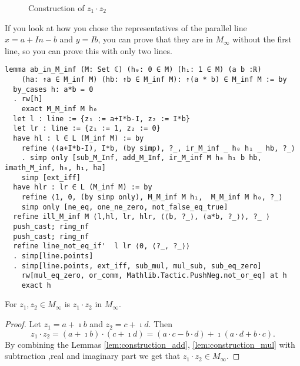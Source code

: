 \begin{figure}[h!]
    \centering
    \caption{Construction of $z_1 \cdot z_2$}
    \label{Fig.5}
\end{figure}

\begin{remark}
    If you look at how you chose the representatives of the parallel line $x = a+In-b$ and $y=Ib$, you can prove that they are in $M_{\infty}$ without the first line, so you can prove this with only two lines.
\end{remark}

\begin{lstlisting}
lemma ab_in_M_inf (M: Set ℂ) (h₀: 0 ∈ M) (h₁: 1 ∈ M) (a b :ℝ) 
    (ha: ↑a ∈ M_inf M) (hb: ↑b ∈ M_inf M): ↑(a * b) ∈ M_inf M := by
  by_cases h: a*b = 0
  . rw[h]
    exact M_M_inf M h₀
  let l : line := {z₁ := a+I*b-I, z₂ := I*b}
  let lr : line := {z₁ := 1, z₂ := 0}
  have hl : l ∈ L (M_inf M) := by
    refine ⟨(a+I*b-I), I*b, (by simp), ?_, ir_M_inf _ h₀ h₁ _ hb, ?_⟩
    . simp only [sub_M_Inf, add_M_Inf, ir_M_inf M h₀ h₁ b hb, imath_M_inf, h₀, h₁, ha]
    simp [ext_iff]
  have hlr : lr ∈ L (M_inf M) := by
    refine ⟨1, 0, (by simp only), M_M_inf M h₁,  M_M_inf M h₀, ?_⟩
    simp only [ne_eq, one_ne_zero, not_false_eq_true]
  refine ill_M_inf M ⟨l,hl, lr, hlr, ⟨⟨b, ?_⟩, ⟨a*b, ?_⟩⟩, ?_ ⟩
  push_cast; ring_nf
  push_cast; ring_nf
  refine line_not_eq_if'  l lr ⟨0, ⟨?_, ?_⟩⟩
  . simp[line.points]
  . simp[line.points, ext_iff, sub_mul, mul_sub, sub_eq_zero]
    rw[mul_eq_zero, or_comm, Mathlib.Tactic.PushNeg.not_or_eq] at h
    exact h
\end{lstlisting}

\begin{corollary}
    \label{cor:construction_mul_complex}
    For $z_1, z_2 \in M_{\infty}$ is $z_1 \cdot z_2$ in $M_{\infty}$.
\end{corollary}
\begin{proof}
    Let $z_1 = a + \imath b$ and $z_2 = c + \imath d$. Then $$z_1 \cdot z_2 = (a + \imath b) \cdot (c + \imath d) = (a \cdot c - b \cdot d) + \imath (a \cdot d + b \cdot c).$$
    By combining the Lemmas \ref{lem:construction_add}, \ref{lem:construction_mul} with subtraction ,real and imaginary part we get that $z_1 \cdot z_2 \in M_{\infty}$.
\end{proof}


